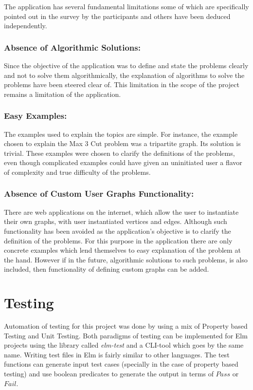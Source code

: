 The application has several fundamental limitations some of which are specifically pointed
out in the survey by the participants and others have been deduced
independently.

\subsubsection{Absence of Algorithmic Solutions:}
Since the objective of the application was to define and state the problems
clearly and not to solve them algorithmically, the explanation of algorithms to
solve the problems have been steered clear of. This limitation in the scope of
the project remains a limitation of the application.

\subsubsection{Easy Examples:}
The examples used to explain the topics are simple. For instance, the example
chosen to explain the Max 3 Cut problem was a tripartite graph.  Its solution
is trivial. These examples were chosen to clarify the definitions of the
problems, even though complicated examples could have given an uninitiated user
a flavor of complexity and true difficulty of the problems.

\subsubsection{Absence of Custom User Graphs Functionality:}
There are web applications on the internet, which allow the user to instantiate
their own graphs, with user instantiated vertices and edges. Although such
functionality has been avoided as the application's objective is to clarify the
definition of the problems. For this purpose in the application there are only
concrete examples which lend themselves to easy explanation of the problem at
the hand. However if in the future, algorithmic solutions to such problems, is
also included, then functionality of defining custom graphs can be added.

\section{Testing}
Automation of testing for this project was done by using a mix of Property
based Testing and Unit Testing. Both paradigms of testing can be implemented
for Elm projects using the library called \emph{elm-test} and a CLI-tool which
goes by the same name. Writing test files in Elm is fairly similar to other languages. The test functions can generate input test cases (specially in
the case of property based testing) and use boolean predicates to generate the
output in terms of $Pass$ or $Fail$.

